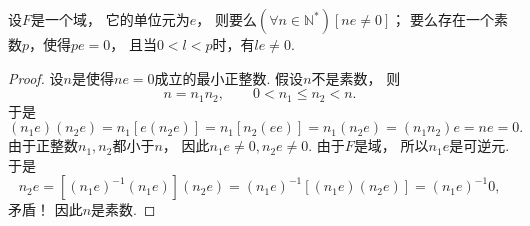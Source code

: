 \begin{theorem}
设\(F\)是一个域，
它的单位元为\(e\)，
则要么\((\forall n\in\mathbb{N}^*)[ne\neq0]\)；
要么存在一个素数\(p\)，使得\(pe=0\)，
且当\(0<l<p\)时，有\(le\neq0\).
\begin{proof}
设\(n\)是使得\(ne=0\)成立的最小正整数.
假设\(n\)不是素数，
则\[
	n=n_1 n_2,
	\qquad
	0<n_1 \leq n_2<n.
\]
于是%
\[
	(n_1 e)(n_2 e)
	=n_1[e(n_2 e)]
	=n_1[n_2(ee)]
	=n_1(n_2 e)
	=(n_1 n_2)e
	=ne=0.
\]
由于正整数\(n_1,n_2\)都小于\(n\)，
因此\(n_1 e\neq0,
n_2 e\neq0\).
由于\(F\)是域，
所以\(n_1 e\)是可逆元.
于是\[
	n_2 e
	=[(n_1 e)^{-1} (n_1 e)](n_2 e)
	=(n_1 e)^{-1}
	[(n_1 e)(n_2 e)]
	=(n_1 e)^{-1} 0,
\]
矛盾！
因此\(n\)是素数.
\end{proof}
\end{theorem}
